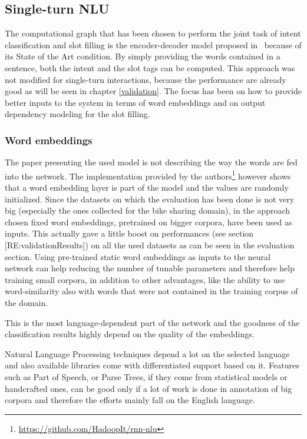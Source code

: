 \subsection{Single-turn NLU}
\label{approachSingleTurn}

The computational graph that has been chosen to perform the joint task of intent classification and slot filling is the encoder-decoder model proposed in~\cite{liu2016attention} because of its State of the Art condition. By simply providing the words contained in a sentence, both the intent and the slot tags can be computed. This approach was not modified for single-turn interactions, because the performance are already good as will be seen in chapter \ref{validation}. The focus has been on how to provide better inputs to the system in terms of word embeddings and on output dependency modeling for the slot filling.

\subsubsection{Word embeddings}
\label{approachWv}

The paper presenting the used model is not describing the way the words are fed into the network. The implementation provided by the authors\footnote{\url{https://github.com/HadoopIt/rnn-nlu}} however shows that a word embedding layer is part of the model and the values are randomly initialized. Since the datasets on which the evaluation has been done is not very big (especially the ones collected for the bike sharing domain), in the approach chosen fixed word embeddings, pretrained on bigger corpora, have been used as inputs. This actually gave a little boost on performances (see section [RE:validationResults]) on all the used datasets as can be seen in the evaluation section. Using pre-trained static word embeddings as inputs to the neural network can help reducing the number of tunable parameters and therefore help training small corpora, in addition to other advantages, like the ability to use word-similarity also with words that were not contained in the training corpus of the domain.

This is the most language-dependent part of the network and the goodness of the classification results highly depend on the quality of the embeddings.

Natural Language Processing techniques depend a lot on the selected language and also available libraries come with differentiated support based on it. Features such as Part of Speech, or Parse Trees, if they come from statistical models or handcrafted ones, can be good only if a lot of work is done in annotation of big corpora and therefore the efforts mainly fall on the English language.

